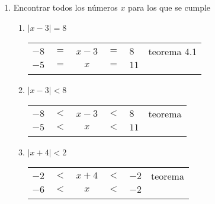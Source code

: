 \begin{enumerate}[\bfseries 1.]
\item Encontrar todos los números $x$ para los que se cumple
\begin{enumerate}[\bfseries (i)]
\item $|x-3|=8$
\begin{center}
\begin{tabular}{rcccll}
$-8$&$=$&$x-3$&$=$&$8$&teorema 4.1\\
$-5$&$=$&$x$&$=$&$11$&\\\\
\end{tabular}
\end{center}

\item $|x-3|<8$
\begin{center}
\begin{tabular}{rcccll}
$-8$&$<$&$x-3$&$<$&$8$&teorema \\
$-5$&$<$&$x$&$<$&$11$&\\\\
\end{tabular}
\end{center}

\item $|x+4|<2$
\begin{center}
\begin{tabular}{rcccll}
$-2$&$<$&$x+4$&$<$&$-2$&teorema \\
$-6$&$<$&$x$&$<$&$-2$&\\\\
\end{tabular}
\end{center}


\end{enumerate}
\end{enumerate}
